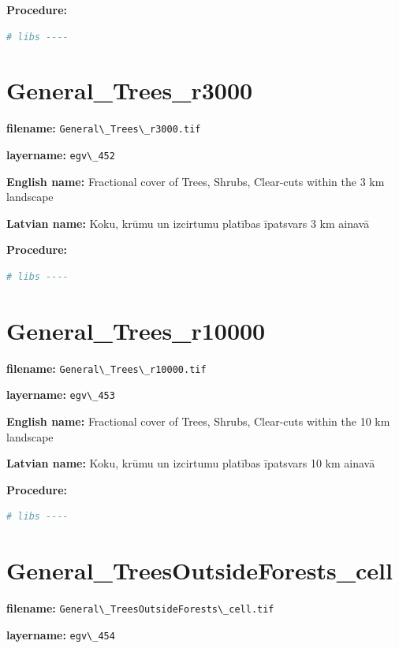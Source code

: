 \documentclass[
]{book}
\newcommand{\passthrough}[1]{#1}
\begin{document}
\textbf{Procedure:}

\begin{lstlisting}[language=R]
# libs ----
\end{lstlisting}

\section{General\_Trees\_r3000}\label{ch06.452}

\textbf{filename:} \passthrough{\lstinline!General\_Trees\_r3000.tif!}

\textbf{layername:} \passthrough{\lstinline!egv\_452!}

\textbf{English name:} Fractional cover of Trees, Shrubs, Clear-cuts within the 3 km landscape

\textbf{Latvian name:} Koku, krūmu un izcirtumu platības īpatsvars 3 km ainavā

\textbf{Procedure:}

\begin{lstlisting}[language=R]
# libs ----
\end{lstlisting}

\section{General\_Trees\_r10000}\label{ch06.453}

\textbf{filename:} \passthrough{\lstinline!General\_Trees\_r10000.tif!}

\textbf{layername:} \passthrough{\lstinline!egv\_453!}

\textbf{English name:} Fractional cover of Trees, Shrubs, Clear-cuts within the 10 km landscape

\textbf{Latvian name:} Koku, krūmu un izcirtumu platības īpatsvars 10 km ainavā

\textbf{Procedure:}

\begin{lstlisting}[language=R]
# libs ----
\end{lstlisting}

\section{General\_TreesOutsideForests\_cell}\label{ch06.454}

\textbf{filename:} \passthrough{\lstinline!General\_TreesOutsideForests\_cell.tif!}

\textbf{layername:} \passthrough{\lstinline!egv\_454!}
\end{document}
